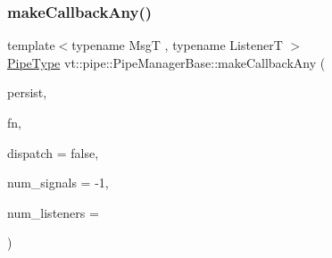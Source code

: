 \mbox{\label{structvt_1_1pipe_1_1_pipe_manager_base_a6fec17887d5cae03c513088ccb4ce3db}} 
\subsubsection{\texorpdfstring{make\+Callback\+Any()}{makeCallbackAny()}}
{\footnotesize\ttfamily template$<$typename MsgT , typename ListenerT $>$ \\
\hyperlink{namespacevt_ac9852acda74d1896f48f406cd72c7bd3}{Pipe\+Type} vt\+::pipe\+::\+Pipe\+Manager\+Base\+::make\+Callback\+Any (\begin{DoxyParamCaption}\item[{bool const \&}]{persist,  }\item[{ListenerT \&\&}]{fn,  }\item[{bool const \&}]{dispatch = {\ttfamily false},  }\item[{\hyperlink{namespacevt_a9b39ce9494bb04674d0d5b895a5aa50f}{Ref\+Type}}]{num\+\_\+signals = {\ttfamily -\/1},  }\item[{\hyperlink{namespacevt_a9b39ce9494bb04674d0d5b895a5aa50f}{Ref\+Type}}]{num\+\_\+listeners = {} }\end{DoxyParamCaption})\hspace{0.3cm}{\ttfamily [protected]}}

\mbox{\label{structvt_1_1pipe_1_1_pipe_manager_base_a7fbd6f5b88e5cca79f8588ea67ce6161}} 
